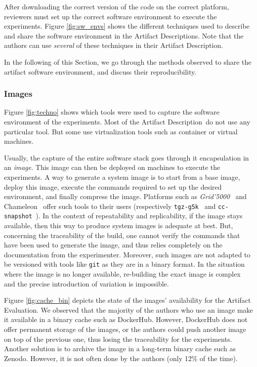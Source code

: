\documentclass[sigconf,natbib=false]{acmart}
\newcommand{\grid}{\emph{Grid'5000}}
\newcommand{\ad}{Artifact Description}
\newcommand{\aeval}{Artifact Evaluation}
\begin{document}
After downloading the correct version of the code on the correct platform, reviewers must set up the correct software environment to execute the experiments.
Figure \ref{fig:sw_envs} shows the different techniques used to describe and share the software environment in the \ad s.
Note that the authors can use \emph{several} of these techniques in their \ad.

In the following of this Section, we go through the methods observed to share the artifact software environment, and discuss their reproducibility.

\subsubsection{Images}\label{sec:sop:sw:images}

Figure \ref{fig:techno} shows which tools were used to capture the software environment of the experiments.
Most of the \ad\ do not use any particular tool.
But some use virtualization tools such as container or virtual machines.

Usually, the capture of the entire software stack goes through it encapsulation in an \emph{image}.
This image can then be deployed on machines to execute the experiments.
A way to generate a system image is to start from a base image, deploy this image, execute the commands required to set up the desired environment, and finally compress the image.
Platforms such as \grid\ \cite{grid5000} and Chameleon\ \cite{chameleon} offer such tools to their users (respectively \texttt{tgz-g5k}\ \cite{tgz-g5k} and \texttt{cc-snapshot}\ \cite{cc-snapshot}).
In the context of repeatability and replicability, if the image stays available, then this way to produce system images is adequate at best.
But, concerning the traceability of the build, one cannot verify the commands that have been used to generate the image, and thus relies completely on the documentation from the experimenter.
Moreover, such images are not adapted to be versioned with tools like \texttt{git} as they are in a binary format.
In the situation where the image is no longer available, re-building the exact image is complex and the precise introduction of variation is impossible.

Figure \ref{fig:cache_bin} depicts the state of the images' availability for the \aeval.
We observed that the majority of the authors who use an image make it available in a binary cache such as DockerHub. 
However, DockerHub does not offer permanent storage of the images, or the authors could push another image on top of the previous one, thus losing the traceability for the experiments.
Another solution is to archive the image in a long-term binary cache such as Zenodo.
However, it is not often done by the authors (only 12\% of the time).
\end{document}
